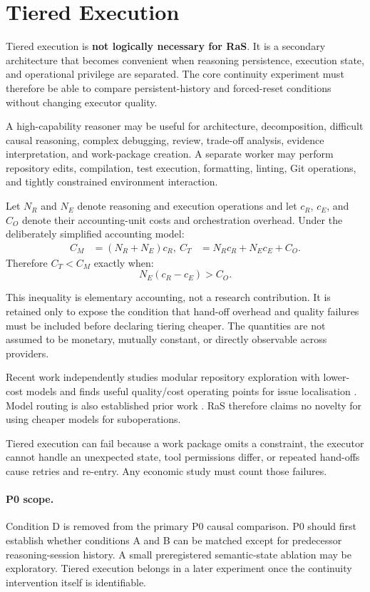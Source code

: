 \section{Tiered Execution}
\label{sec:tiered}

Tiered execution is \textbf{not logically necessary for RaS}. It is a secondary architecture that becomes convenient when reasoning persistence, execution state, and operational privilege are separated. The core continuity experiment must therefore be able to compare persistent-history and forced-reset conditions without changing executor quality.

A high-capability reasoner may be useful for architecture, decomposition, difficult causal reasoning, complex debugging, review, trade-off analysis, evidence interpretation, and work-package creation. A separate worker may perform repository edits, compilation, test execution, formatting, linting, Git operations, and tightly constrained environment interaction.



Let $N_R$ and $N_E$ denote reasoning and execution operations and let $c_R$, $c_E$, and $C_O$ denote their accounting-unit costs and orchestration overhead. Under the deliberately simplified accounting model:
\begin{align}
C_M&=(N_R+N_E)c_R,\
C_T&=N_Rc_R+N_Ec_E+C_O.
\end{align}
Therefore $C_T<C_M$ exactly when:
\begin{equation}
N_E(c_R-c_E)>C_O.
\label{eq:tiered}
\end{equation}

This inequality is elementary accounting, not a research contribution. It is retained only to expose the condition that hand-off overhead and quality failures must be included before declaring tiering cheaper. The quantities are not assumed to be monetary, mutually constant, or directly observable across providers.

Recent work independently studies modular repository exploration with lower-cost models and finds useful quality/cost operating points for issue localisation \citep{awad2026exploration}. Model routing is also established prior work \citep{ong2024routellm}. RaS therefore claims no novelty for using cheaper models for suboperations.

Tiered execution can fail because a work package omits a constraint, the executor cannot handle an unexpected state, tool permissions differ, or repeated hand-offs cause retries and re-entry. Any economic study must count those failures.

\paragraph{P0 scope.}
Condition D is removed from the primary P0 causal comparison. P0 should first establish whether conditions A and B can be matched except for predecessor reasoning-session history. A small preregistered semantic-state ablation may be exploratory. Tiered execution belongs in a later experiment once the continuity intervention itself is identifiable.
